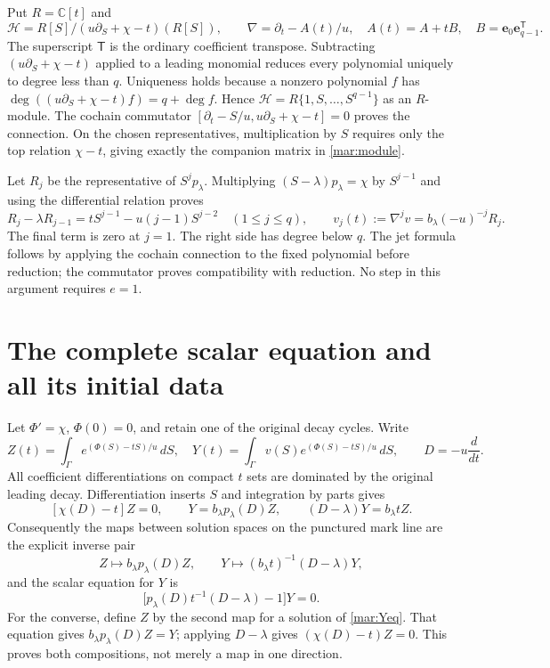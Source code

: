 \documentclass[11pt]{article}
\newcommand{\CC}{\mathbb C}
\begin{document}
Put $R=\CC[t]$ and
\begin{equation}\tag{MAR2}\label{mar:module}
 \mathscr H=R[S]/(u\partial_S+\chi-t)(R[S]),\qquad
 \nabla=\partial_t-A(t)/u,
 \quad A(t)=A+tB,\quad B=\mathbf e_0\mathbf e_{q-1}^{\mathsf T}.
\end{equation}
The superscript $\mathsf T$ is the ordinary coefficient transpose.
Subtracting $(u\partial_S+\chi-t)$ applied to a leading monomial
reduces every polynomial uniquely to degree less than $q$. Uniqueness
holds because a nonzero polynomial $f$ has
$\deg((u\partial_S+\chi-t)f)=q+\deg f$. Hence
$\mathscr H=R\{1,S,\ldots,S^{q-1}\}$ as an $R$-module.
The cochain commutator
$[\partial_t-S/u,u\partial_S+\chi-t]=0$ proves the connection.
On the chosen representatives, multiplication by $S$ requires only
the top relation $\chi-t$, giving exactly the companion matrix in
\eqref{mar:module}.

Let $R_j$ be the representative of $S^jp_\lambda$. Multiplying
$(S-\lambda)p_\lambda=\chi$ by $S^{j-1}$ and using the differential
relation proves
\begin{equation}\tag{MAR3}\label{mar:rec}
 R_j-\lambda R_{j-1}=tS^{j-1}-u(j-1)S^{j-2}\quad(1\le j\le q),
 \qquad v_j(t):=\nabla^jv=b_\lambda(-u)^{-j}R_j.
\end{equation}
The final term is zero at $j=1$. The right side has degree below $q$.
The jet formula follows by applying the cochain connection to the fixed
polynomial before reduction; the commutator proves compatibility with
reduction. No step in this argument requires $e=1$.

\section{The complete scalar equation and all its initial data}
Let $\Phi'=\chi$, $\Phi(0)=0$, and retain one of the original decay
cycles. Write
\[
 Z(t)=\int_\Gamma e^{(\Phi(S)-tS)/u}\,dS,\quad
 Y(t)=\int_\Gamma v(S)e^{(\Phi(S)-tS)/u}\,dS,
 \qquad D=-u\frac{d}{dt}.
\]
All coefficient differentiations on compact $t$ sets are dominated by
the original leading decay. Differentiation inserts $S$ and integration
by parts gives
\begin{equation}\tag{MAR4}\label{mar:scalar-maps}
 [\chi(D)-t]Z=0,\qquad
 Y=b_\lambda p_\lambda(D)Z,\qquad
 (D-\lambda)Y=b_\lambda t Z.
\end{equation}
Consequently the maps between solution spaces on the punctured mark line
are the explicit inverse pair
\begin{equation}\tag{MAR5}\label{mar:inverse-solutions}
 Z\longmapsto b_\lambda p_\lambda(D)Z,
 \qquad Y\longmapsto (b_\lambda t)^{-1}(D-\lambda)Y,
\end{equation}
and the scalar equation for $Y$ is
\begin{equation}\tag{MAR6}\label{mar:Yeq}
 \bigl[p_\lambda(D)t^{-1}(D-\lambda)-1\bigr]Y=0.
\end{equation}
For the converse, define $Z$ by the second map for a solution of
\eqref{mar:Yeq}. That equation gives $b_\lambda p_\lambda(D)Z=Y$;
applying $D-\lambda$ gives $(\chi(D)-t)Z=0$. This proves both
compositions, not merely a map in one direction.
\end{document}
